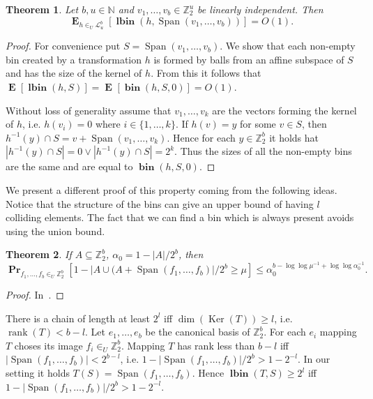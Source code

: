 \documentclass{article}
\newcommand{\bin}[3]{\operatorname{\mathbf{bin}}({#1}, {#2}, {#3})}
\newcommand{\lbin}[2]{\operatorname{\mathbf{lbin}}({#1}, {#2})}
\newcommand{\vecspace}[2]{\mathbb{Z}_{#1}^{#2}}
\newcommand{\binvecspace}[1]{\vecspace{2}{#1}}
\newcommand{\linearmaps}[2]{\mathcal{L}_{#1}^{#2}}
\newcommand{\probs}[2]{\operatorname{\mathbf{Pr}}_{{#1}}\left[{#2}\right]}
\newcommand{\expects}[2]{\operatorname{\mathbf{E}}_{{#1}}\left[{#2}\right]}
\newcommand{\expect}[1]{\expects{}{#1}}
\newtheorem{theorem}{Theorem}
\begin{document}
\begin{theorem}
Let $b, u \in \mathbb{N}$ and $v_1, \dots, v_b \in \mathbb{Z}_2^u$ be linearly independent. Then \[ \expects{h \in_U \linearmaps{u}{b}}{\lbin{h}{\operatorname{Span}(v_1, \dots, v_b)}} = O(1) .\]
\end{theorem}
\begin{proof}
For convenience put $S = \operatorname{Span}(v_1, \dots, v_b)$. 
We show that each non-empty bin created by a transformation $h$ is formed by balls from an affine subspace of $S$ and has the size of the kernel of $h$.
From this it follows that $\expect{\lbin{h}{S}} = \expect{\bin{h}{S}{0}} = O(1)$.

Without loss of generality assume that $v_1, \dots, v_k$ are the vectors forming the kernel of $h$, i.e. $h(v_i) = 0$ where $i \in \{1, \dots, k\}$.
If $h(v) = y$ for some $v \in S$, then $h^{-1}(y) \cap S = v + \operatorname{Span}(v_1, \dots, v_k)$.
Hence for each $y \in \mathbb{Z}_2^b$ it holds hat $|h^{-1}(y) \cap S| = 0 \vee |h^{-1}(y) \cap S| = 2^k$.
Thus the sizes of all the non-empty bins are the same and are equal to $\bin{h}{S}{0}$.
\end{proof}



We present a different proof of this property coming from the following ideas.
Notice that the structure of the bins can give an upper bound of having $l$ colliding elements.
The fact that we can find a bin which is always present avoids using the union bound.

\begin{theorem}
\label{theorem-bound-general}
If $A \subseteq \binvecspace{b}$, $\alpha_0 = 1 - |A|/2^b$, then \[\probs{f_1, \dots, f_b \in_U \binvecspace{b}}{1 - |A \cup (A + \operatorname{Span}(f_1, \dots, f_b)|/2^b \geq \mu} \leq \alpha_0^{b - \log \log \mu^{-1} + \log \log \alpha_0^{-1}}.\]
\end{theorem}
\begin{proof}
In~\cite{alonetal}.
\end{proof}

There is a chain of length at least $2^l$ iff $\operatorname{dim}(\operatorname{Ker}(T)) \geq l$, i.e. $\operatorname{rank}(T) < b - l$.
Let $e_1, \dots, e_b$ be the canonical basis of $\binvecspace{b}$. For each $e_i$ mapping  $T$ choses its image $f_i \in_U \binvecspace{b}$.
Mapping $T$ has rank less than $b - l$ iff $|\operatorname{Span}(f_1, \dots, f_b)| < 2^{b - l}$, i.e. $1 - |\operatorname{Span}(f_1, \dots, f_b)|/2^b > 1 - 2^{-l}$.
In our setting it holds $T(S) = \operatorname{Span}(f_1, \dots, f_b)$.
Hence $\lbin{T}{S} \geq 2^l$ iff $1 - |\operatorname{Span}(f_1, \dots, f_b)|/2^b > 1 - 2^{-l}$.
\end{document}
